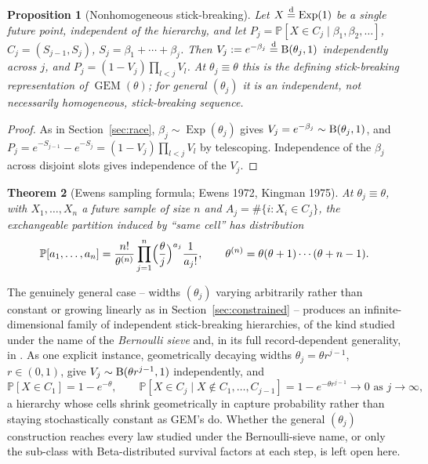 \documentclass[11pt]{article}
\newcommand{\PP}{\mathbb{P}}
\DeclareMathOperator{\Exp}{Exp}
\DeclareMathOperator{\GEM}{GEM}
\theoremstyle{plain}
\newtheorem{theorem}{Theorem}[section]
\newtheorem{proposition}[theorem]{Proposition}
\theoremstyle{definition}
\begin{document}
\begin{proposition}[Nonhomogeneous stick-breaking]
\label{prop:gem}
Let \(X\stackrel{\rm d}{=}\Exp(1)\) be a single future point, independent of the hierarchy, and let \(P_j=\PP[X\in C_j\mid\beta_1,\beta_2,\dots]\), \(C_j=(S_{j-1},S_j)\), \(S_j=\beta_1+\cdots+\beta_j\). Then \(V_j:=e^{-\beta_j}\stackrel{\rm d}{=}{\rm B}(\theta_j,1)\) independently across \(j\), and \(P_j=(1-V_j)\prod_{l<j}V_l\). At \(\theta_j\equiv\theta\) this is the defining stick-breaking representation of \(\GEM(\theta)\); for general \((\theta_j)\) it is an independent, not necessarily homogeneous, stick-breaking sequence.
\end{proposition}

\begin{proof}
As in Section~\ref{sec:race}, \(\beta_j\sim\Exp(\theta_j)\) gives \(V_j=e^{-\beta_j}\sim{\rm B}(\theta_j,1)\), and \(P_j=e^{-S_{j-1}}-e^{-S_j}=(1-V_j)\prod_{l<j}V_l\) by telescoping. Independence of the \(\beta_j\) across disjoint slots gives independence of the \(V_j\).
\end{proof}

\begin{theorem}[Ewens sampling formula; Ewens 1972, Kingman 1975]
\label{thm:esf}
At \(\theta_j\equiv\theta\), with \(X_1,\dots,X_n\) a future sample of size \(n\) and \(A_j=\#\{i:X_i\in C_j\}\), the exchangeable partition induced by ``same cell'' has distribution
\begin{equation}
\label{eq:esf}
\PP[a_1,\dots,a_n]=\frac{n!}{\theta^{(n)}}\prod_{j=1}^n\Bigl(\frac\theta j\Bigr)^{a_j}\frac1{a_j!},
\qquad\theta^{(n)}=\theta(\theta+1)\cdots(\theta+n-1).
\end{equation}
\end{theorem}

The genuinely general case -- widths \((\theta_j)\) varying arbitrarily rather than constant or growing linearly as in Section~\ref{sec:constrained} -- produces an infinite-dimensional family of independent stick-breaking hierarchies, of the kind studied under the name of the \emph{Bernoulli sieve} \cite{GnedinPartitionsConstraints,GnedinIksanovMarynych2010,gnedin2010bernoulli} and, in its full record-dependent generality, in \cite{GnedinBiasRecord}. As one explicit instance, geometrically decaying widths \(\theta_j=\theta r^{j-1}\), \(r\in(0,1)\), give \(V_j\sim{\rm B}(\theta r^{j-1},1)\) independently, and
\[
\PP[X\in C_1]=1-e^{-\theta},\qquad \PP[X\in C_j\mid X\notin C_1,\dots,C_{j-1}]=1-e^{-\theta r^{j-1}}\to0\text{ as }j\to\infty,
\]
a hierarchy whose cells shrink geometrically in capture probability rather than staying stochastically constant as GEM's do. Whether the general \((\theta_j)\) construction reaches every law studied under the Bernoulli-sieve name, or only the sub-class with Beta-distributed survival factors at each step, is left open here.
\end{document}
